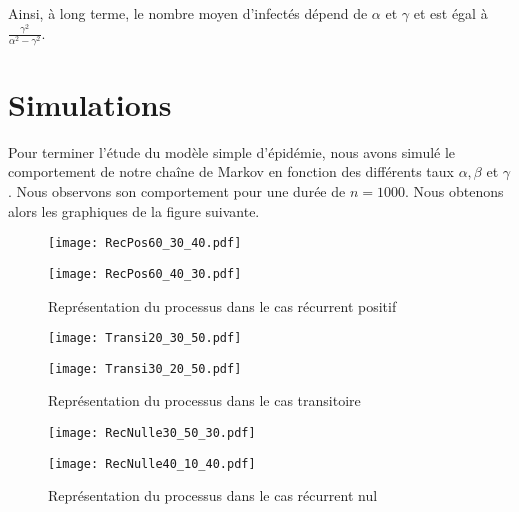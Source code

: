 \documentclass[12pt,a4paper]{report}
\theoremstyle{remark}
\begin{document}
Ainsi, à long terme, le nombre moyen d'infectés dépend de $\alpha$ et $\gamma$ et est égal à $\frac{\gamma^2}{\alpha^2-\gamma^2}$.

\section{Simulations}
\vspace{0.6cm}

Pour terminer l'étude du modèle simple d'épidémie, nous avons simulé le comportement de notre chaîne de Markov en fonction des différents taux $\alpha, \beta$ et $ \gamma$. Nous observons son comportement pour une durée de $n=1000$. Nous obtenons alors les graphiques de la figure suivante. \\
\begin{figure}[h!]
    \begin{minipage}[c]{0.25\linewidth}
        \centering
        \texttt{[image: RecPos60\_30\_40.pdf]}
    \end{minipage}
    \hfill%
    \vspace{0.1cm}
    \begin{minipage}[c]{0.50\linewidth}
        \centering
        \texttt{[image: RecPos60\_40\_30.pdf]}  
    \end{minipage}
    \caption{Représentation du processus dans le cas récurrent positif}
    \label{fig_rec_positif}
\end{figure}

\begin{figure}[h!]
    \begin{minipage}[c]{0.25\linewidth}
        \centering
        \texttt{[image: Transi20\_30\_50.pdf]}
    \end{minipage}
    \hfill%
    \vspace{0.1cm}
    \begin{minipage}[c]{0.50\linewidth}
        \centering
        \texttt{[image: Transi30\_20\_50.pdf]}
    \end{minipage}
      \caption{Représentation du processus dans le cas transitoire}
      \label{fig_transitoire}
\end{figure}

\begin{figure}[h!]
    \begin{minipage}[c]{0.25\linewidth}
        \centering
        \texttt{[image: RecNulle30\_50\_30.pdf]}
    \end{minipage}
    \hfill%
    \vspace{0.1cm}
    \begin{minipage}[c]{0.50\linewidth}
        \centering
        \texttt{[image: RecNulle40\_10\_40.pdf]}
    \end{minipage}
      \caption{Représentation du processus dans le cas récurrent nul}
      \label{fig_rec_nul}
\end{figure}
 
\end{document}
